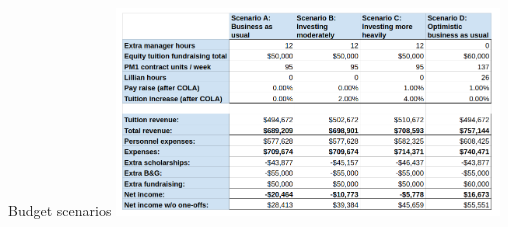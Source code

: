 \documentclass[8pt]{beamer}
\begin{document}
\begin{frame}{Budget scenarios}
\includegraphics[width=4in]{budget_scenarios.png}

\end{frame}
\end{document}
